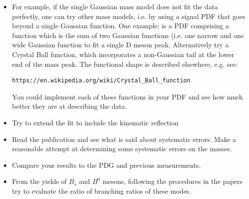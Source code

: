 \begin{enumerate}
\begin{itemize} 
\item For example, if the single
Gaussian mass model does not fit the data perfectly, one can try other mass models,
i.e. by using a signal PDF that goes beyond a single Gaussian
function. One example: is a PDF comprising a function which is the sum of two Gaussian functions (i.e. one
narrow and one wide Gaussian function to fit a single D meson
peak. Alternatively try a Crystal Ball function, which incorporates a non-Gaussian tail at the lower end of
the mass peak. The functional shape is described elsewhere, e.g. see:
\begin{verbatim}
https://en.wikipedia.org/wiki/Crystal_Ball_function 
\end{verbatim} 
You could implement each of these functions in your PDF and see how much better
they are at describing the data.
\item Try to extend the fit to include the kinematic reflection
\item Read the publication and see what is said about systematic errors. Make a reasonable
attempt at determining some systematic errors on the masses.
\item Compare your results to the PDG and previous measurements.
\item From the yields of $B_s$ and $B^0$ mesons, following the
  procedures in the papers try to evaluate the ratio of branching
  ratios of these modes.
\end{itemize}

\end{enumerate}

